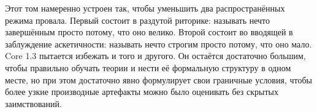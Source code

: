 Этот том намеренно устроен так, чтобы уменьшить два распространённых режима провала.
Первый состоит в раздутой риторике: называть нечто завершённым просто потому, что оно велико.
Второй состоит во вводящей в заблуждение аскетичности: называть нечто строгим просто потому, что оно мало.
Core 1.3 пытается избежать и того и другого.
Он остаётся достаточно большим, чтобы правильно обучать теории и нести её формальную структуру в одном месте, но при этом достаточно явно формулирует свои граничные условия, чтобы более узкие производные артефакты можно было оценивать без скрытых заимствований.

\clearpage
